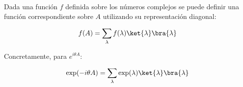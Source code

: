 Dada una función $f$ definida sobre los números complejos se puede definir una función correspondiente sobre $A$ utilizando su representación diagonal:

\begin{align*}
  f(A) = \sum_\lambda f(\lambda) \ket{\lambda}\bra{\lambda}
\end{align*}

Concretamente, para $e^{i \theta A}$:

\begin{align*}
   \exp( -i \theta A) = \sum_\lambda \exp(\lambda) \ket{\lambda}\bra{\lambda}
\end{align*}

